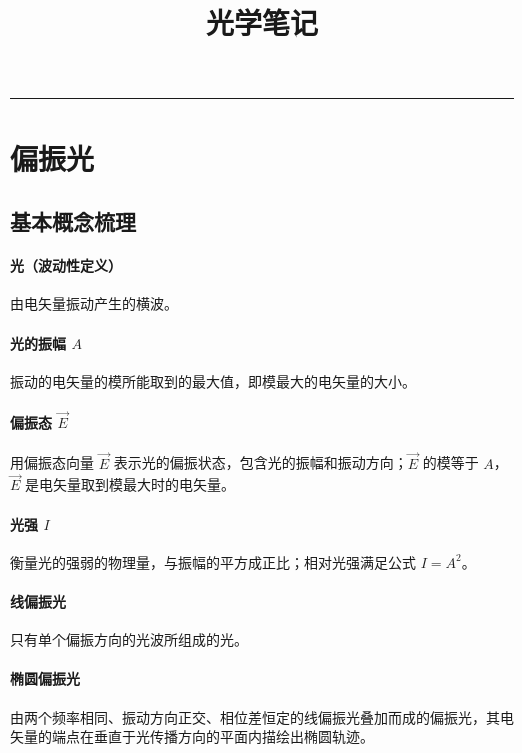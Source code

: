 \documentclass{article}
\title{\textbf{光学笔记}}
\author{}
\date{}
\begin{document}
	\maketitle
	
	\tableofcontents
	\vspace{1cm}
	\hrule  %
	\vspace{1cm}
	
	\pagebreak
	
	\section{偏振光}
	\subsection{基本概念梳理}
	\paragraph{光（波动性定义）}
	由电矢量振动产生的横波。
	
	\paragraph{光的振幅 \(A\)}
	振动的电矢量的模所能取到的最大值，即模最大的电矢量的大小。
	
	\paragraph{偏振态 \(\vec{E}\)}
	用偏振态向量 \(\vec{E}\) 表示光的偏振状态，包含光的振幅和振动方向；\(\vec{E}\) 的模等于 \(A\)，\(\vec{E}\) 是电矢量取到模最大时的电矢量。
	
	\paragraph{光强 \(I\)}
	衡量光的强弱的物理量，与振幅的平方成正比；相对光强满足公式 \(I = A^2\)。
	
	\paragraph{线偏振光}
	只有单个偏振方向的光波所组成的光。
	
	\paragraph{椭圆偏振光}
	由两个频率相同、振动方向正交、相位差恒定的线偏振光叠加而成的偏振光，其电矢量的端点在垂直于光传播方向的平面内描绘出椭圆轨迹。
	
\end{document}
